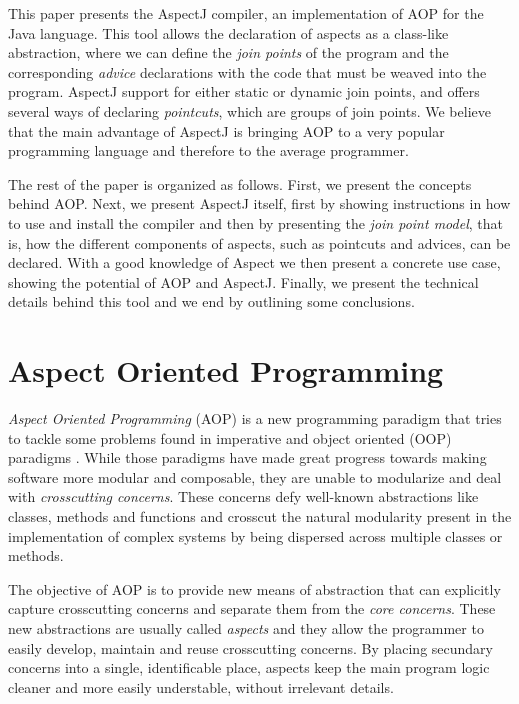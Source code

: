 \documentclass{template}
\begin{document}
This paper presents the AspectJ compiler, an implementation of AOP for the Java language. This tool allows the declaration
of aspects as a class-like abstraction, where we can define the \emph{join points} of the program and the corresponding
\emph{advice} declarations with the code that must be weaved into the program. AspectJ support for either static or dynamic join points,
and offers several ways of declaring \emph{pointcuts}, which are groups of join points.
We believe that the main advantage of AspectJ is bringing AOP to a very popular programming language and therefore to the average programmer.

The rest of the paper is organized as follows. First, we present the concepts behind AOP. Next, we present
AspectJ itself, first by showing instructions in how to use and install the compiler and then by presenting the \emph{join point model},
that is, how the different components of aspects, such as pointcuts and advices, can be declared. With a good knowledge
of Aspect we then present a concrete use case, showing the potential of AOP and AspectJ. Finally, we present the technical details
behind this tool and we end by outlining some conclusions.

\section{Aspect Oriented Programming}

\emph{Aspect Oriented Programming} (AOP) is a new programming paradigm that tries to tackle some problems
found in imperative and object oriented (OOP) paradigms \cite{Kiczales97aspect-orientedprogramming}. While those paradigms have made great progress towards
making software more modular and composable, they are unable to modularize and deal with \emph{crosscutting concerns}.
These concerns defy well-known abstractions like classes, methods and functions and crosscut the
natural modularity present in the implementation of complex systems by being dispersed
across multiple classes or methods. \cite{Kiczales01anoverview}

The objective of AOP is to provide new means of abstraction that can explicitly capture crosscutting concerns
and separate them from the \emph{core concerns}. These new abstractions are usually called \emph{aspects}
and they allow the programmer to easily develop, maintain and reuse crosscutting concerns. By placing
secundary concerns into a single, identificable place, aspects keep the main program logic cleaner and more easily
understable, without irrelevant details.
\end{document}
